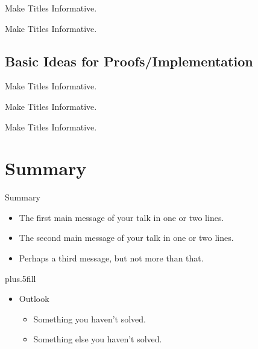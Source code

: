 \documentclass{beamer}
\begin{document}
\begin{frame}{Make Titles Informative.}
\end{frame}

\begin{frame}{Make Titles Informative.}
\end{frame}


\subsection{Basic Ideas for Proofs/Implementation}

\begin{frame}{Make Titles Informative.}
\end{frame}

\begin{frame}{Make Titles Informative.}
\end{frame}

\begin{frame}{Make Titles Informative.}
\end{frame}



\section*{Summary}

\begin{frame}{Summary}

  \begin{itemize}
  \item
    The \alert{first main message} of your talk in one or two lines.
  \item
    The \alert{second main message} of your talk in one or two lines.
  \item
    Perhaps a \alert{third message}, but not more than that.
  \end{itemize}
  
  \vskip0pt plus.5fill
  \begin{itemize}
  \item
    Outlook
    \begin{itemize}
    \item
      Something you haven't solved.
    \item
      Something else you haven't solved.
    \end{itemize}
  \end{itemize}
\end{frame}
\end{document}
